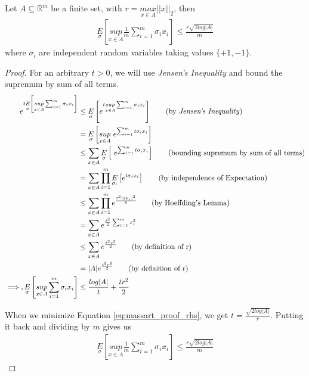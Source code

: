 \documentclass[../toml]{subfiles}
\begin{document}
\begin{theorem} \label{th:massart}
Let $A \subseteq \mathbb{R}^m$ be a finite set, with $r = \underset{x \in A}{max} || x ||_2$,
then
\begin{align}
\underset{\sigma}{E}\left[ \underset{x \in A}{sup} \frac{1}{m} \sum_{i=1}^{m} \sigma_i x_i \right] \leq \frac{r \sqrt{2 log |A|}}{m}
\end{align}
where $\sigma_i$ are independent random variables taking values $\{+1,-1\}$.
\end{theorem}
\begin{proof}
For an arbitrary $t>0$, we will use \textit{Jensen's Inequality} and bound the supremum by
sum of all terms.
\begin{align}
e^{t\underset{\sigma}{E}\left[ \underset{x \in A}{sup} \sum_{i=1}^{m} \sigma_i x_i \right]}
&\leq \underset{\sigma}{E}\left[ e^{t\underset{x \in A}{sup} \sum_{i=1}^{m} \sigma_i x_i} \right] \tag{by \textit{Jensen's Inequality}} \\
&= \underset{\sigma}{E}\left[ \underset{x \in A}{sup} \text{ } e^{\sum_{i=1}^{m} t\sigma_i x_i} \right] \nonumber \\
&\leq \sum_{x \in A} \underset{\sigma}{E}\left[ \text{ } e^{\sum_{i=1}^{m} t\sigma_i x_i} \right] \tag{bounding supremum by sum of all terms} \\
&= \sum_{x \in A} \prod_{i=1}^{m} \underset{\sigma_i}{E}\left[ e^{t\sigma_i x_i} \right] \tag{by independence of Expectation} \\
&\leq \sum_{x \in A} \prod_{i=1}^{m}  e^{\frac{t^2 (2x_i)^2}{8}} \tag{by Hoeffding's Lemma} \\
&= \sum_{x \in A} e^{\frac{t^2}{2} \sum_{i=1}^{m} x_i^2} \nonumber \\
&\leq \sum_{x \in A} e^{\frac{t^2r^2}{2}} \tag{by definition of r} \\
&= |A| e^{\frac{t^2r^2}{2}} \tag{by definition of r} \\
\implies, \underset{\sigma}{E}\left[ \underset{x \in A}{sup} \sum_{i=1}^{m} \sigma_i x_i \right] &\leq \frac{log |A|}{t} + \frac{tr^2}{2} \label{eq:massart_proof_rhs}
\end{align}

When we minimize Equation \ref{eq:massart_proof_rhs}, we get $t = \frac{\sqrt{2log|A|}}{r}$.
Putting it back and dividing by $m$ gives us
\begin{align}
\underset{\sigma}{E}\left[ \underset{x \in A}{sup} \frac{1}{m} \sum_{i=1}^{m} \sigma_i x_i \right] \leq \frac{r \sqrt{2 log |A|}}{m}
\end{align}
\end{proof}
\end{document}
